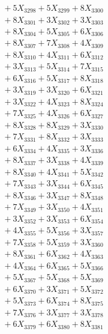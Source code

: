 \documentclass[a4paper,10pt]{article}
\begin{document}
{\begin{align}
&\;  + 5 X_{3298} + 5 X_{3299} + 8 X_{3300} \\[0.3ex]
&\;  + 8 X_{3301} + 3 X_{3302} + 3 X_{3303} \\[0.3ex]
&\;  + 8 X_{3304} + 5 X_{3305} + 6 X_{3306} \\[0.3ex]
&\;  + 8 X_{3307} + 7 X_{3308} + 4 X_{3309} \\[0.5ex]\allowbreak
&\;  + 8 X_{3310} + 4 X_{3311} + 6 X_{3312} \\[0.3ex]
&\;  + 3 X_{3313} + 5 X_{3314} + 7 X_{3315} \\[0.3ex]
&\;  + 6 X_{3316} + 5 X_{3317} + 8 X_{3318} \\[0.3ex]
&\;  + 3 X_{3319} + 3 X_{3320} + 6 X_{3321} \\[0.3ex]
&\;  + 3 X_{3322} + 4 X_{3323} + 8 X_{3324} \\[0.3ex]
&\;  + 7 X_{3325} + 4 X_{3326} + 6 X_{3327} \\[0.3ex]
&\;  + 8 X_{3328} + 8 X_{3329} + 3 X_{3330} \\[0.3ex]
&\;  + 7 X_{3331} + 8 X_{3332} + 3 X_{3333} \\[0.3ex]
&\;  + 6 X_{3334} + 4 X_{3335} + 3 X_{3336} \\[0.3ex]
&\;  + 8 X_{3337} + 3 X_{3338} + 4 X_{3339} \\[0.5ex]\allowbreak
&\;  + 8 X_{3340} + 4 X_{3341} + 5 X_{3342} \\[0.3ex]
&\;  + 7 X_{3343} + 3 X_{3344} + 6 X_{3345} \\[0.3ex]
&\;  + 8 X_{3346} + 3 X_{3347} + 8 X_{3348} \\[0.3ex]
&\;  + 7 X_{3349} + 3 X_{3350} + 4 X_{3351} \\[0.3ex]
&\;  + 3 X_{3352} + 3 X_{3353} + 6 X_{3354} \\[0.3ex]
&\;  + 4 X_{3355} + 5 X_{3356} + 3 X_{3357} \\[0.3ex]
&\;  + 7 X_{3358} + 5 X_{3359} + 3 X_{3360} \\[0.3ex]
&\;  + 8 X_{3361} + 6 X_{3362} + 4 X_{3363} \\[0.3ex]
&\;  + 4 X_{3364} + 6 X_{3365} + 5 X_{3366} \\[0.3ex]
&\;  + 5 X_{3367} + 5 X_{3368} + 5 X_{3369} \\[0.5ex]\allowbreak
&\;  + 6 X_{3370} + 3 X_{3371} + 5 X_{3372} \\[0.3ex]
&\;  + 5 X_{3373} + 6 X_{3374} + 8 X_{3375} \\[0.3ex]
&\;  + 7 X_{3376} + 3 X_{3377} + 3 X_{3378} \\[0.3ex]
&\;  + 6 X_{3379} + 6 X_{3380} + 8 X_{3381} \\[0.3ex]

\end{align}}
\end{document}
